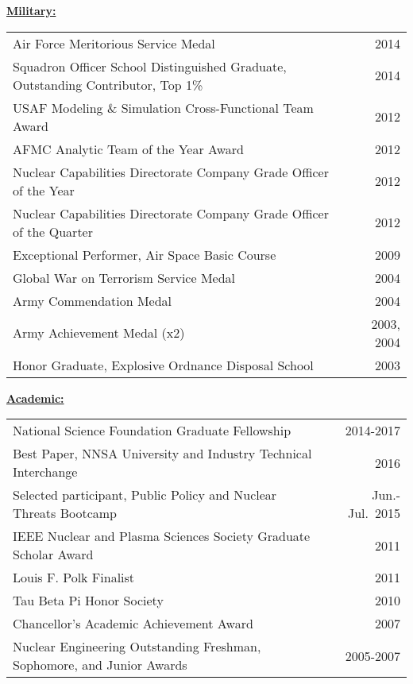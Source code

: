 \underline{\textbf{Military:}}\\
\begin{tabular}{ @{} l @{\hspace{6ex}} r }
Air Force Meritorious Service Medal & 2014 \\
Squadron Officer School Distinguished Graduate, Outstanding Contributor, Top 1\% & 2014 \\
USAF Modeling \& Simulation Cross-Functional Team Award & 2012 \\
AFMC Analytic Team of the Year Award & 2012 \\
Nuclear Capabilities Directorate Company Grade Officer of the Year & 2012 \\
Nuclear Capabilities Directorate Company Grade Officer of the Quarter & 2012 \\
Exceptional Performer, Air Space Basic Course & 2009 \\
Global War on Terrorism Service Medal & 2004 \\
Army Commendation Medal & 2004 \\
Army Achievement Medal (x2) & 2003, 2004 \\
Honor Graduate, Explosive Ordnance Disposal School & 2003 \\
\end{tabular}

\underline{\textbf{Academic:}}\\
\begin{tabular}{ @{} l @{\hspace{9.5ex}} r }
National Science Foundation Graduate Fellowship & 2014-2017 \\
Best Paper, NNSA University and Industry Technical Interchange & 2016 \\
Selected participant, Public Policy and Nuclear Threats Bootcamp	& Jun.-Jul.\ 2015 \\
IEEE Nuclear and Plasma Sciences Society Graduate Scholar Award & 2011 \\
Louis F. Polk Finalist & 2011 \\
Tau Beta Pi Honor Society	& 2010 \\
Chancellor’s Academic Achievement Award	& 2007 \\
Nuclear Engineering Outstanding Freshman, Sophomore, and Junior Awards & 2005-2007 \\
\end{tabular}
